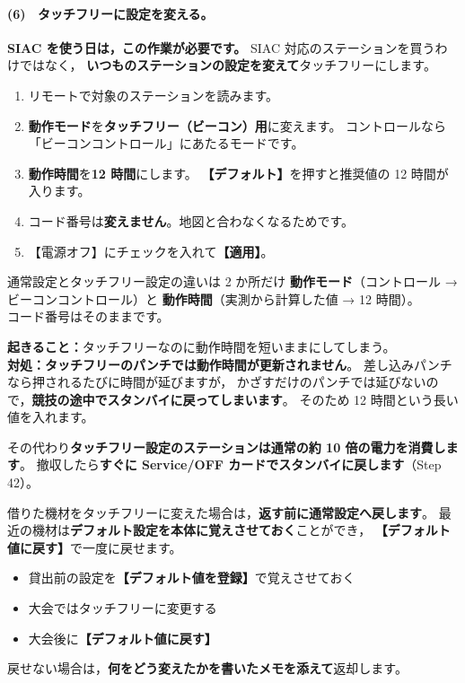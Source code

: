 \paragraph{(6) \tSIAC\ タッチフリーに設定を変える。}

\textbf{SIAC を使う日は，この作業が必要です。}
SIAC 対応のステーションを買うわけではなく，
\textbf{いつものステーションの設定を変えて}タッチフリーにします。

\begin{enumerate}
\item リモートで対象のステーションを読みます。
\item \textbf{動作モード}を\textbf{タッチフリー（ビーコン）用}に変えます。
      コントロールなら「ビーコンコントロール」にあたるモードです。
\item \textbf{動作時間}を\textbf{12 時間}にします。
      \textbf{【デフォルト】}を押すと推奨値の 12 時間が入ります。
\item コード番号は\textbf{変えません}。地図と合わなくなるためです。
\item 【電源オフ】にチェックを入れて\textbf{【適用】}。
\end{enumerate}


\begin{Key}{通常設定とタッチフリー設定の違いは 2 か所だけ}
\textbf{動作モード}（コントロール → ビーコンコントロール）と
\textbf{動作時間}（実測から計算した値 → 12 時間）。\\
コード番号はそのままです。
\end{Key}

\begin{Fail}
\textbf{起きること：}タッチフリーなのに動作時間を短いままにしてしまう。\\
\textbf{対処：}\textbf{タッチフリーのパンチでは動作時間が更新されません}。
差し込みパンチなら押されるたびに時間が延びますが，
かざすだけのパンチでは延びないので，\textbf{競技の途中でスタンバイに戻ってしまいます}。
そのため 12 時間という長い値を入れます。

その代わり\textbf{タッチフリー設定のステーションは通常の約 10 倍の電力を消費します}。
撤収したら\textbf{すぐに Service/OFF カードでスタンバイに戻します}（Step 42）。
\end{Fail}

\begin{Note}[大会が終わったら元に戻す]
借りた機材をタッチフリーに変えた場合は，\textbf{返す前に通常設定へ戻します}。
最近の機材は\textbf{デフォルト設定を本体に覚えさせておく}ことができ，
\textbf{【デフォルト値に戻す】}で一度に戻せます。
\begin{itemize}
\item 貸出前の設定を\textbf{【デフォルト値を登録】}で覚えさせておく
\item 大会ではタッチフリーに変更する
\item 大会後に\textbf{【デフォルト値に戻す】}
\end{itemize}
戻せない場合は，\textbf{何をどう変えたかを書いたメモを添えて}返却します。
\end{Note}

